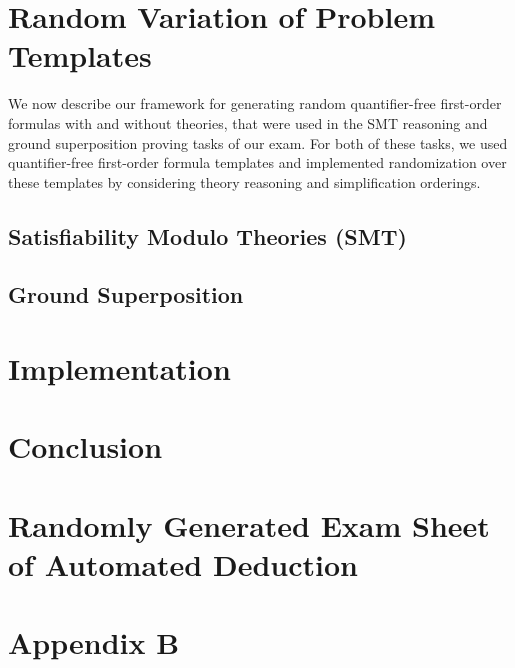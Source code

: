 \documentclass[12pt]{llncs}
\begin{document}



\section{Random Variation of Problem Templates}\label{sec:smtqf}

We now describe our framework for generating random quantifier-free
first-order formulas with and without theories, that were used in
the SMT reasoning and ground
superposition proving tasks of our exam. For both of these tasks, we
used quantifier-free first-order formula templates and implemented
randomization over these templates by considering theory reasoning and
simplification orderings.

\subsection{Satisfiability Modulo Theories (SMT)}\label{sec:smt}





\subsection{Ground Superposition}\label{sec:qf}

\label{sec:gs}



\section{Implementation}\label{sec:implementation}



\section{Conclusion}








\newpage
\appendix

\section{Randomly Generated Exam Sheet of Automated Deduction}\label{appendixA}
\BgThispage
\newpage
\clearpage

\section{Appendix B}\label{appendixB}

\end{document}
